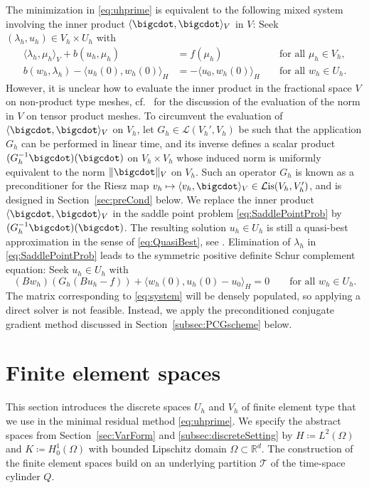 \documentclass{amsart}
\providecommand{\tria}{\mathcal{T}}
\newcommand{\cL}{\mathcal L}
\newcommand{\Lis}{\cL\mathrm{is}}
\begin{document}
The minimization in \eqref{eq:uhprime} is equivalent \cite[Sec.~3.2]{MonsuurStevensonStorn23} to the following mixed system involving the inner product $\langle \bigcdot,\bigcdot \rangle_V$ in $V$: Seek $(\lambda_h,u_h) \in V_h \times U_h$ with
\begin{equation}\label{eq:SaddlePointProb}
\begin{aligned}
\langle \lambda_h,\mu_h\rangle_V +b(u_h,\mu_h)  &= f(\mu_h) &&\text{ for all } \mu_h\in V_h,\\
b(w_h,\lambda_h) - \langle u_h(0),w_h(0)\rangle_{H} & =-\langle u_0,w_h(0)\rangle_H&&\text{ for all }w_h\in U_h.
\end{aligned}
\end{equation}
%
However, it is unclear how to evaluate the inner product in the fractional space $V$ on non-product type meshes, cf.~\cite{SteinbachZank20,Zank20} for the discussion of the evaluation of the norm in $V$ on tensor product meshes.
To circumvent the evaluation of $\langle \bigcdot,\bigcdot\rangle_V$ on $V_h$, let $G_h \in \cL(V_h',V_h)$
be such that the application $G_h$ can be performed in linear time, and its inverse defines a scalar product $(G_h^{-1} \bigcdot)(\bigcdot)$ on $V_h \times V_h$ whose induced norm is uniformly equivalent to the norm $\|\bigcdot\|_{V}$ on $V_h$.
Such an operator $G_h$ is known as a preconditioner for the Riesz map $v_h\mapsto \langle v_h,\bigcdot \rangle_V \in \Lis(V_h,V_h')$, and is designed in Section~\ref{sec:preCond} below.
We replace the inner product  $\langle \bigcdot,\bigcdot\rangle_V$ in the saddle point problem \eqref{eq:SaddlePointProb} by $(G_h^{-1} \bigcdot)(\bigcdot)$.
The resulting solution $u_h \in U_h$ is still a quasi-best approximation in the sense of \eqref{eq:QuasiBest}, see \cite[Thm.~3.5]{MonsuurStevensonStorn23}. 
Elimination of $\lambda_h$ in \eqref{eq:SaddlePointProb} leads to the symmetric positive definite Schur complement equation: Seek $u_h \in U_h$ with 
\begin{equation}\label{eq:system}
(B w_h) (G_h (Bu_h-f))+\langle w_h(0),u_h(0)-u_0\rangle_{H}=0\qquad \text{for all }w_h \in U_h.
\end{equation}
The matrix corresponding to \eqref{eq:system} will be densely populated, so applying a direct solver is not feasible. Instead, we apply the preconditioned conjugate gradient method discussed in Section~\ref{subsec:PCGscheme} below.

\section{Finite element spaces}\label{sec:Discretization}
This section introduces the discrete spaces $U_h$ and $V_h$ of finite element type that we use in the minimal residual method \eqref{eq:uhprime}. 
We specify the %
abstract spaces from Section~\ref{sec:VarForm} and \ref{subsec:discreteSetting} by $H \coloneqq L^2(\Omega)$ and $K \coloneqq H^1_0(\Omega)$ with bounded Lipschitz domain $\Omega \subset \mathbb{R}^d$. 
The construction of the finite element spaces build on an underlying partition $\tria$ of the time-space cylinder $Q$.
%
\end{document}

